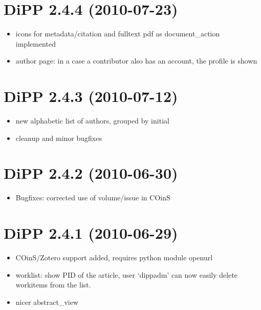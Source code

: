 \documentclass[a4paper,10pt,ngerman]{sphinxmanual}
\begin{document}
\section{DiPP 2.4.4 (2010-07-23)}
\label{changelog:dipp-2-4-4-2010-07-23}\begin{itemize}
\item {} 
icons for metadata/citation and fulltext pdf as document\_action implemented

\item {} 
author page: in a case a contributor also has an account, the profile is shown

\end{itemize}


\section{DiPP 2.4.3 (2010-07-12)}
\label{changelog:dipp-2-4-3-2010-07-12}\begin{itemize}
\item {} 
new alphabetic list of authors, grouped by initial

\item {} 
cleanup and minor bugfixes

\end{itemize}


\section{DiPP 2.4.2 (2010-06-30)}
\label{changelog:dipp-2-4-2-2010-06-30}\begin{itemize}
\item {} 
Bugfixes: corrected use of volume/issue in COinS

\end{itemize}


\section{DiPP 2.4.1 (2010-06-29)}
\label{changelog:dipp-2-4-1-2010-06-29}\begin{itemize}
\item {} 
COinS/Zotero support added, requires python module openurl

\item {} 
worklist: show PID of the article, user `dippadm' can now
easily delete workitems from the list.

\item {} 
nicer abstract\_view

\end{itemize}
\end{document}
